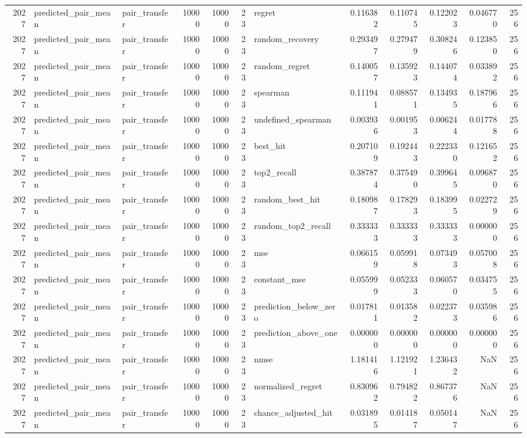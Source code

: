 \begin{tabular}{rllrrrlrrrrr}
2027 & predicted_pair_mean & pair_transfer & 10000 & 10000 & 23 & regret & 0.116382 & 0.110745 & 0.122023 & 0.046770 & 256 \\
2027 & predicted_pair_mean & pair_transfer & 10000 & 10000 & 23 & random_recovery & 0.293497 & 0.279479 & 0.308246 & 0.123850 & 256 \\
2027 & predicted_pair_mean & pair_transfer & 10000 & 10000 & 23 & random_regret & 0.140057 & 0.135923 & 0.144074 & 0.033892 & 256 \\
2027 & predicted_pair_mean & pair_transfer & 10000 & 10000 & 23 & spearman & 0.111941 & 0.088571 & 0.134935 & 0.187966 & 256 \\
2027 & predicted_pair_mean & pair_transfer & 10000 & 10000 & 23 & undefined_spearman & 0.003936 & 0.001953 & 0.006244 & 0.017788 & 256 \\
2027 & predicted_pair_mean & pair_transfer & 10000 & 10000 & 23 & best_hit & 0.207109 & 0.192443 & 0.222330 & 0.121652 & 256 \\
2027 & predicted_pair_mean & pair_transfer & 10000 & 10000 & 23 & top2_recall & 0.387874 & 0.375490 & 0.399645 & 0.096870 & 256 \\
2027 & predicted_pair_mean & pair_transfer & 10000 & 10000 & 23 & random_best_hit & 0.180987 & 0.178293 & 0.183995 & 0.022729 & 256 \\
2027 & predicted_pair_mean & pair_transfer & 10000 & 10000 & 23 & random_top2_recall & 0.333333 & 0.333333 & 0.333333 & 0.000000 & 256 \\
2027 & predicted_pair_mean & pair_transfer & 10000 & 10000 & 23 & mse & 0.066159 & 0.059918 & 0.073493 & 0.057008 & 256 \\
2027 & predicted_pair_mean & pair_transfer & 10000 & 10000 & 23 & constant_mse & 0.055999 & 0.052333 & 0.060570 & 0.034755 & 256 \\
2027 & predicted_pair_mean & pair_transfer & 10000 & 10000 & 23 & prediction_below_zero & 0.017811 & 0.013582 & 0.022373 & 0.035986 & 256 \\
2027 & predicted_pair_mean & pair_transfer & 10000 & 10000 & 23 & prediction_above_one & 0.000000 & 0.000000 & 0.000000 & 0.000000 & 256 \\
2027 & predicted_pair_mean & pair_transfer & 10000 & 10000 & 23 & nmse & 1.181416 & 1.121921 & 1.236432 & NaN & 256 \\
2027 & predicted_pair_mean & pair_transfer & 10000 & 10000 & 23 & normalized_regret & 0.830962 & 0.794822 & 0.867376 & NaN & 256 \\
2027 & predicted_pair_mean & pair_transfer & 10000 & 10000 & 23 & chance_adjusted_hit & 0.031895 & 0.014187 & 0.050147 & NaN & 256 \\

\end{tabular}
